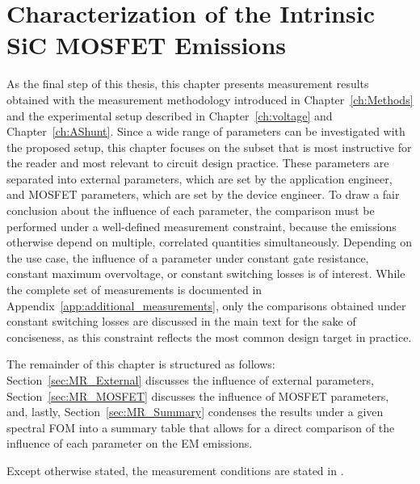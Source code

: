 \chapter{Characterization of the Intrinsic SiC MOSFET Emissions}
\label{ch:Results}

As the final step of this thesis, this chapter presents measurement results obtained with the measurement methodology introduced in Chapter~\ref{ch:Methods} and the experimental setup described in Chapter~\ref{ch:voltage} and Chapter~\ref{ch:AShunt}.
Since a wide range of parameters can be investigated with the proposed setup, this chapter focuses on the subset that is most instructive for the reader and most relevant to circuit design practice.
These parameters are separated into external parameters, which are set by the application engineer, and MOSFET parameters, which are set by the device engineer.
To draw a fair conclusion about the influence of each parameter, the comparison must be performed under a well-defined measurement constraint, because the emissions otherwise depend on multiple, correlated quantities simultaneously.
Depending on the use case, the influence of a parameter under constant gate resistance, constant maximum overvoltage, or constant switching losses is of interest.
While the complete set of measurements is documented in Appendix~\ref{app:additional_measurements}, only the comparisons obtained under constant switching losses are discussed in the main text for the sake of conciseness, as this constraint reflects the most common design target in practice.

The remainder of this chapter is structured as follows: Section~\ref{sec:MR_External} discusses the influence of external parameters, Section~\ref{sec:MR_MOSFET} discusses the influence of MOSFET parameters, and, lastly, Section~\ref{sec:MR_Summary} condenses the results under a given spectral FOM into a summary table that allows for a direct comparison of the influence of each parameter on the EM emissions.

Except otherwise stated, the measurement conditions are stated in .

